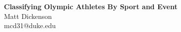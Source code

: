 \documentclass[landscape, paperwidth=42in, paperheight=36in,
fontscale=.35, margin=1in]{baposter}
\begin{document}
\begin{poster}
{        %
\hspace{-1.5in}
} {%
\textsf{
	\bf{Classifying Olympic Athletes By Sport and Event}}
} { %
~\\
  \hspace{-0.4in}
	\vspace{1em} \textsf{Matt Dickenson}\\
  \vspace{-0.1in}
  \hspace{-0.4in}
	{\smaller \textsf{mcd31@duke.edu}}
} {%
  \centering
  \setlength\fboxsep{0pt}
        \setlength\fboxrule{0.5pt}
  \hspace{1.6in}
}



\end{poster}
\end{document}
